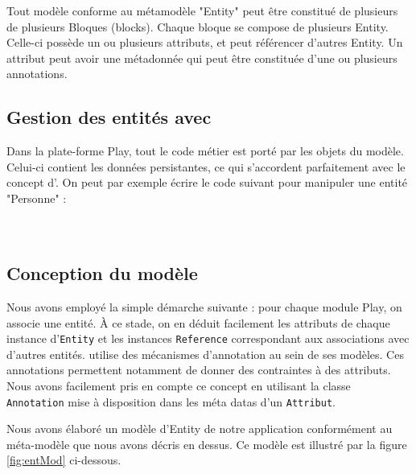 Tout modèle conforme au métamodèle "Entity" peut être constitué de plusieurs de plusieurs Bloques (blocks). Chaque bloque se compose de plusieurs Entity. Celle-ci possède un ou plusieurs attributs, et peut référencer d'autres Entity. Un attribut peut avoir une métadonnée qui peut être constituée d'une ou plusieurs annotations.   

\subsection{Gestion des entités avec \kwplay{}}
Dans la plate-forme Play, tout le code métier est porté par les objets du modèle. Celui-ci contient les données persistantes, ce qui s'accordent parfaitement avec le concept d'\kwentity.  
On peut par exemple écrire le code suivant pour manipuler une entité "Personne" :\\
         
\\
\\
\subsection{Conception du modèle}
Nous avons employé la simple démarche suivante : pour chaque module Play, on associe une entité. À ce stade, on en déduit facilement les attributs de chaque instance d'\verb+Entity+ et les instances \verb+Reference+ correspondant aux associations avec d'autres entités. \kwplay{} utilise des mécanismes d'annotation au sein de ses modèles. Ces annotations permettent notamment de donner des contraintes à des attributs. Nous avons facilement pris en compte ce concept en utilisant la classe \verb+Annotation+ mise à disposition dans les méta datas d'un \verb+Attribut+.

Nous avons élaboré un modèle d'Entity de notre application conformément au méta-modèle que nous avons décris en dessus. Ce modèle est illustré par la figure \ref{fig:entMod} ci-dessous.

